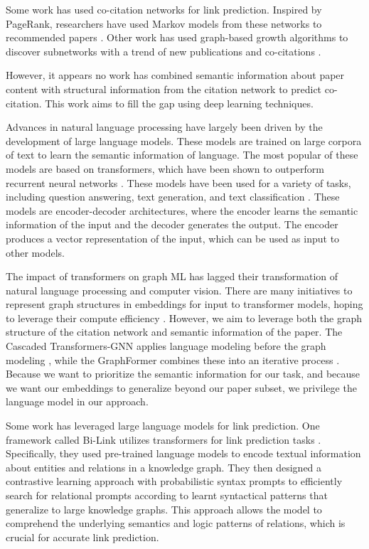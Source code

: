 \documentclass[10pt,twocolumn,letterpaper]{article}
\begin{document}
Some work has used co-citation networks for link prediction. Inspired by PageRank, researchers have used Markov models from these networks to recommended papers \cite{zhu2002using}. Other work has used graph-based growth algorithms to discover subnetworks with a trend of new publications and co-citations \cite{smojver2021exploring}.

However, it appears no work has combined semantic information about paper content with structural information from the citation network to predict co-citation. This work aims to fill the gap using deep learning techniques.

Advances in natural language processing have largely been driven by the development of large language models. These models are trained on large corpora of text to learn the semantic information of language. The most popular of these models are based on transformers, which have been shown to outperform recurrent neural networks \cite{vaswani2017attention}. These models have been used for a variety of tasks, including question answering, text generation, and text classification \cite{devlin2018bert}. These models are encoder-decoder architectures, where the encoder learns the semantic information of the input and the decoder generates the output. The encoder produces a vector representation of the input, which can be used as input to other models. 

The impact of transformers on graph ML has lagged their transformation of natural language processing and computer vision. There are many initiatives to represent graph structures in embeddings for input to transformer models, hoping to leverage their compute efficiency \cite{ying2021transformers,kim2022pure}. However, we aim to leverage both the graph structure of the citation network and semantic information of the paper. The Cascaded Transformers-GNN applies language modeling before the graph modeling \cite{hamilton2017inductive}, while the GraphFormer combines these into an iterative process \cite{yang2021graphformers}. Because we want to prioritize the semantic information for our task, and because we want our embeddings to generalize beyond our paper subset, we privilege the language model in our approach.

Some work has leveraged large language models for link prediction. One  framework called Bi-Link utilizes transformers for link prediction tasks \cite{peng2022bi}. Specifically, they used pre-trained language models to encode textual information about entities and relations in a knowledge graph. They then designed a contrastive learning approach with probabilistic syntax prompts to efficiently search for relational prompts according to learnt syntactical patterns that generalize to large knowledge graphs. This approach allows the model to comprehend the underlying semantics and logic patterns of relations, which is crucial for accurate link prediction.
\end{document}
